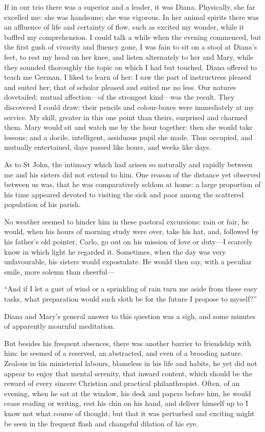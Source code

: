 If in our trio there was a superior and a leader, it was Diana. 
Physically, she far excelled me: she was handsome; she was vigorous. In
her animal spirits there was an affluence of life and certainty of flow,
such as excited my wonder, while it baffled my comprehension. I could
talk a while when the evening commenced, but the first gush of vivacity
and fluency gone, I was fain to sit on a stool at Diana's feet, to rest
my head on her knee, and listen alternately to her and Mary, while they
sounded thoroughly the topic on which I had but touched. Diana offered
to teach me German. I liked to learn of her: I saw the part of
instructress pleased and suited her; that of scholar pleased and suited
me no less. Our natures dovetailed: mutual affection---of the strongest
kind---was the result. They discovered I could draw: their pencils and
colour-boxes were immediately at my service. My skill, greater in this
one point than theirs, surprised and charmed them. Mary would sit and
watch me by the hour together: then she would take lessons; and a
docile, intelligent, assiduous pupil she made. Thus occupied, and
mutually entertained, days passed like hours, and weeks like days.

As to \Mr{} St John, the intimacy which had arisen so naturally and
rapidly between me and his sisters did not extend to him. One reason of
the distance yet observed between us was, that he was comparatively
seldom at home: a large proportion of his time appeared devoted to
visiting the sick and poor among the scattered population of his parish.

No weather seemed to hinder him in these pastoral excursions: rain or
fair, he would, when his hours of morning study were over, take his hat,
and, followed by his father's old pointer, Carlo, go out on his mission
of love or duty---I scarcely know in which light he regarded it. 
Sometimes, when the day was very unfavourable, his sisters would
expostulate. He would then say, with a peculiar smile, more solemn than
cheerful---

\enquote{And if I let a gust of wind or a sprinkling of rain turn me
aside from these easy tasks, what preparation would such sloth be for
the future I propose to myself?}

Diana and Mary's general answer to this question was a sigh, and some
minutes of apparently mournful meditation.

But besides his frequent absences, there was another barrier to
friendship with him: he seemed of a reserved, an abstracted, and even of
a brooding nature. Zealous in his ministerial labours, blameless in his
life and habits, he yet did not appear to enjoy that mental serenity,
that inward content, which should be the reward of every sincere
Christian and practical philanthropist. Often, of an evening, when he
sat at the window, his desk and papers before him, he would cease
reading or writing, rest his chin on his hand, and deliver himself up to
I know not what course of thought; but that it was perturbed and
exciting might be seen in the frequent flash and changeful dilation of
his eye.

